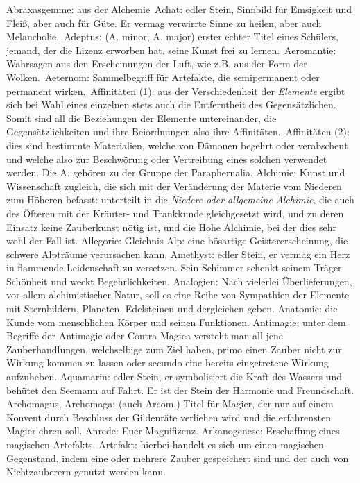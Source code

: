 \documentclass[a5paper,8pt]{book}
\begin{document}
Abraxasgemme: aus der \textit{}Alchemie\
Achat: edler Stein, Sinnbild für Emsigkeit und Fleiß, aber auch für Güte. Er vermag verwirrte Sinne zu heilen, aber auch Melancholie.\
Adeptus: (A. minor, A. major) erster echter Titel eines Schülers, jemand, der die Lizenz erworben hat, seine Kunst frei zu lernen.\
Aeromantie: Wahrsagen aus den Erscheinungen der \textit{}Luft, wie z.B. aus der Form der Wolken.\
Aeternom: Sammelbegriff für Artefakte, die semipermanent oder permanent wirken.\
Affinitäten (1): aus der Verschiedenheit der \textit{Elemente} ergibt sich bei Wahl eines einzelnen stets auch die 
Entferntheit des Gegensätzlichen. Somit sind all die Beziehungen der Elemente untereinander, die Gegensätzlichkeiten und 
ihre Beiordnungen also ihre Affinitäten.\
Affinitäten (2): dies sind bestimmte Materialien, welche von Dämonen begehrt oder verabscheut und welche also zur 
Beschwörung oder Vertreibung eines solchen verwendet werden. Die A. gehören zu der Gruppe der \textit{}Paraphernalia.
Alchimie: Kunst und Wissenschaft zugleich, die sich mit der Veränderung der Materie vom Niederen zum Höheren befasst: 
unterteilt in die \textit{Niedere oder allgemeine Alchimie}, die auch des Öfteren mit der Kräuter- und Trankkunde gleichgesetzt wird, und zu deren Einsatz keine Zauberkunst nötig ist, und die \textit{}Hohe Alchimie, bei der dies sehr wohl der Fall ist.
Allegorie: Gleichnis
Alp: eine bösartige Geistererscheinung, die schwere Alpträume verursachen kann.
Amethyst: edler Stein, er vermag ein Herz in flammende Leidenschaft zu versetzen. Sein Schimmer schenkt seinem Träger Schönheit und weckt Begehrlichkeiten.
Analogien: Nach vielerlei Überlieferungen, vor allem alchimistischer Natur, soll es eine Reihe von Sympathien der Elemente mit Sternbildern, Planeten, Edelsteinen und dergleichen geben.
Anatomie: die Kunde vom menschlichen Körper und seinen Funktionen.
Antimagie: unter dem Begriffe der Antimagie oder Contra Magica versteht man all jene Zauberhandlungen, welchselbige zum 
Ziel haben, primo einen Zauber nicht zur Wirkung kommen zu lassen oder secundo eine bereits eingetretene Wirkung 
aufzuheben.
Aquamarin: edler Stein, er symbolisiert die Kraft des Wassers und behütet den Seemann auf Fahrt. Er ist der Stein der Harmonie und Freundschaft.
Archomagus, Archomaga: (auch Arcom.) Titel für Magier, der nur auf einem Konvent durch Beschluss der Gildenräte verliehen wird und die erfahrensten Magier ehren soll. Anrede: Euer Magnifizenz.
Arkanogenese: Erschaffung eines magischen \textit{}Artefakts.
Artefakt: hierbei handelt es sich um einen magischen Gegenstand, indem eine oder mehrere Zauber gespeichert sind und der auch von Nichtzauberern genutzt werden kann.
\end{document}
